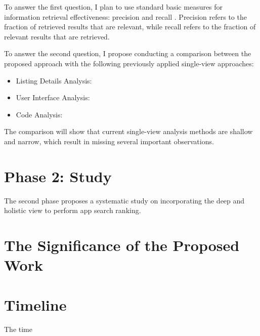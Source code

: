 To answer the first question, I plan to use standard basic measures for information retrieval effectiveness: precision and recall \cite{manning_2008_intro_to_IR}.
Precision refers to the fraction of retrieved results that are relevant, while recall refers to the fraction of relevant results that are retrieved.

To answer the second question, I propose conducting a comparison between the proposed approach with the following previously applied single-view approaches:
\begin{itemize}
	\item Listing Details Analysis:
	\item User Interface Analysis:
	\item Code Analysis:
\end{itemize}
The comparison will show that current single-view analysis methods are shallow and narrow, which result in missing several important observations.

\section{Phase 2: Study}
The second phase proposes a systematic study on incorporating the deep and holistic view to perform app search ranking.
\section{The Significance of the Proposed Work}

\section{Timeline}
The time


